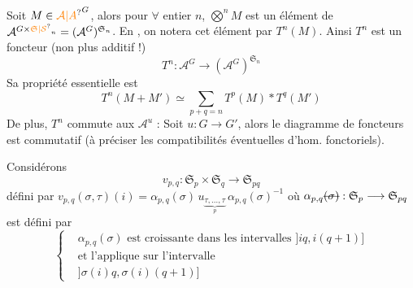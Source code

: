 Soit $M\in{\unsure{\mathcal A|A}}^G$, alors pour $\forall$ entier $n$, $\bigotimes^n M$ est un
élément de $\mathcal A^{G\times\unsure{\mathfrak S|\mathcal S}_n}=(\mathcal A^G)^{\mathfrak S_n}$. En  ,
on notera cet élément par $T^n(M)$. Ainsi $T^n$ est
un foncteur (non plus additif !)
\[
T^n:\mathcal A^G\longrightarrow(\mathcal A^G)^{\mathfrak S_n} \tag*{(15)}
\]
Sa propriété essentielle est
\[
\boxed{T^n(M+M')\simeq\sum_{p+q=n}T^p(M)*T^q(M')} \tag*{(16)}
\]
De plus, $T^n$ commute aux $\mathcal A^u$ : Soit $u:G\longrightarrow G'$,
alors le diagramme de foncteurs
est commutatif (à préciser les compatibilités
 éventuelles d'hom. fonctoriels).

Considérons
\[
v_{p,q}:\mathfrak S_p\times\mathfrak S_q\longrightarrow\mathfrak S_{pq} \tag*{(18)}
\]
défini par $v_{p,q}(\sigma,\tau)(i)=\alpha_{p,q}(\sigma)\,u_{\underbrace{\tau,\ldots,\tau}_{p}}\,\alpha_{p,q}(\sigma)^{-1}$
où $\alpha_{p,q}\deleted{(\sigma)}:\mathfrak S_p\longrightarrow\mathfrak S_{pq}$ est défini par
\[
\left\{\begin{aligned}
&\alpha_{p,q}(\sigma)\text{ est croissante dans les intervalles } ]iq,i(q+1)]\\
&\text{et l'applique sur l'intervalle}\\
&]\sigma(i)q,\sigma(i)(q+1)]
\end{aligned}\right. \tag*{(19)}
\]


